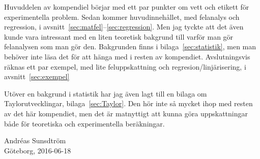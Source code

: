 \documentclass[11pt,a4paper, swedish
]{article}
\newcounter{exempel_counter}%
\begin{document}
Huvuddelen av kompendiel börjar med ett par punkter om vett och
etikett för experimentella problem. 
Sedan kommer huvudinnehållet, med felanalys och regression, i
avsnitt~\ref{sec:matfel}--\ref{sec:regression}. 
Men jag tyckte att det även kunde vara intressant med en liten
teoretisk bakgrund till varför man gör felanalysen som man gör
den. Bakgrunden finns i bilaga~\ref{sec:statistik}, men man behöver
inte läsa det för att hänga med i resten av kompendiet.
Avslutningsvis räknas ett par exempel, med lite feluppskattning och
regresion/linjärisering, i avsnitt~\ref{sec:exempel}

Utöver en bakgrund i statistik har jag även lagt till en bilaga om
Taylorutvecklingar, bilaga~\ref{sec:Taylor}. Den hör inte så mycket
ihop med resten av det här kompendiet, men det är matnyttigt att kunna
göra uppskattningar både för teoretiska och experimentella beräkningar. 

\begin{flushright}
Andréas Sunsdtröm\\ 
Göteborg, 2016-06-18
\end{flushright}
\normalsize


\thispagestyle{empty}
\clearpage
\thispagestyle{empty}
\tableofcontents

\clearpage
\setcounter{page}{1}
\end{document}
